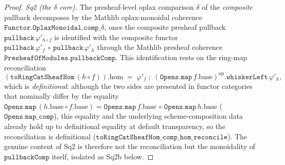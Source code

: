 \begin{proof}
  \emph{Sq2 (the \(\delta\) core).} The presheaf-level oplax comparison \(\delta\) of the
  \emph{composite} pullback decomposes by the Mathlib oplax-monoidal coherence
  \(\mathtt{Functor.OplaxMonoidal.comp\_}\delta\), once the composite presheaf pullback
  \(\mathtt{pullback}\,\varphi'_{h \circ f}\) is identified with the composite functor
  \(\mathtt{pullback}\,\varphi'_{f} \,\circ\, \mathtt{pullback}\,\varphi'_{h}\) through the
  Mathlib presheaf coherence \(\mathtt{PresheafOfModules.pullbackComp}\). This
  identification rests on the ring-map reconciliation
  \[
    (\mathtt{toRingCatSheafHom}\,(h \circ f)).\mathrm{hom}
      \;=\; \varphi'_{f} \;\mathbin{;}\;
      (\mathtt{Opens.map}\,f.\mathrm{base})^{\mathrm{op}}.\mathtt{whiskerLeft}\,\varphi'_{h},
  \]
  which is \emph{definitional}: although the two sides are presented in functor categories
  that nominally differ by the equality \(\mathtt{Opens.map}\,(h.\mathrm{base} \circ
  f.\mathrm{base}) = \mathtt{Opens.map}\,f.\mathrm{base} \,\circ\, \mathtt{Opens.map}\,
  h.\mathrm{base}\) (\(\mathtt{Opens.map\_comp}\)), this equality and the underlying
  scheme-composition data already hold up to definitional equality at default
  transparency, so the reconciliation is definitional
  (\(\mathtt{toRingCatSheafHom\_comp\_hom\_reconcile}\)). The genuine content of Sq2 is
  therefore not the reconciliation but the monoidality of \(\mathtt{pullbackComp}\) itself,
  isolated as Sq2b below.


\end{proof}
